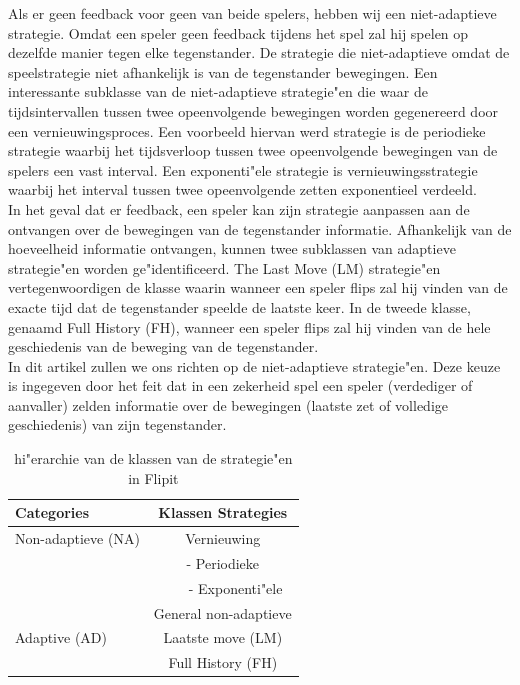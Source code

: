 \documentclass[master=cws, masteroption=vs]{kulemt}
\begin{document}
\begin{abstract*}
Als er geen feedback voor geen van beide spelers, hebben wij een niet-adaptieve strategie. Omdat een speler geen feedback tijdens het spel zal hij spelen op dezelfde manier tegen elke tegenstander. De strategie die niet-adaptieve omdat de speelstrategie niet afhankelijk is van de tegenstander bewegingen. Een interessante subklasse van de niet-adaptieve strategie"en die waar de tijdsintervallen tussen twee opeenvolgende bewegingen worden gegenereerd door een vernieuwingsproces. Een voorbeeld hiervan werd strategie is de periodieke strategie waarbij het tijdsverloop tussen twee opeenvolgende bewegingen van de spelers een vast interval. Een exponenti"ele strategie is vernieuwingsstrategie waarbij het interval tussen twee opeenvolgende zetten exponentieel verdeeld. \\
In het geval dat er feedback, een speler kan zijn strategie aanpassen aan de ontvangen over de bewegingen van de tegenstander informatie. Afhankelijk van de hoeveelheid informatie ontvangen, kunnen twee subklassen van adaptieve strategie"en worden ge"identificeerd. The Last Move (LM) strategie"en vertegenwoordigen de klasse waarin wanneer een speler flips zal hij vinden van de exacte tijd dat de tegenstander speelde de laatste keer. In de tweede klasse, genaamd Full History (FH), wanneer een speler flips zal hij vinden van de hele geschiedenis van de beweging van de tegenstander. \\
In dit artikel zullen we ons richten op de niet-adaptieve strategie"en. Deze keuze is ingegeven door het feit dat in een zekerheid spel een speler (verdediger of aanvaller) zelden informatie over de bewegingen (laatste zet of volledige geschiedenis) van zijn tegenstander. \\


 \begin{table}
 \center
 \begin {tabular} {l | c}
  \textbf{Categories} & \textbf{Klassen Strategies} \\
  \hline Non-adaptieve (NA) & Vernieuwing \\
  & - Periodieke \\
  & ~~~ - Exponenti"ele \\
  & General non-adaptieve \\
  \hline Adaptive (AD) & Laatste move (LM) \\
  & Full History (FH) \\
\end{tabular}
 \caption{hi"erarchie van de klassen van de strategie"en in Flipit}
 \label{tabel: Strategies}
 \end{table}



\end{abstract*}
\end{document}
